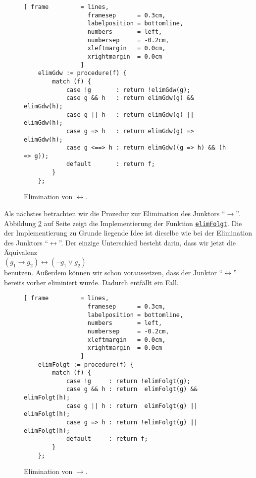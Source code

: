 \begin{figure}[!ht]
  \centering
\begin{Verbatim}[ frame         = lines, 
                  framesep      = 0.3cm, 
                  labelposition = bottomline,
                  numbers       = left,
                  numbersep     = -0.2cm,
                  xleftmargin   = 0.0cm,
                  xrightmargin  = 0.0cm
                ]
    elimGdw := procedure(f) {
        match (f) {
            case !g       : return !elimGdw(g);
            case g && h   : return elimGdw(g) && elimGdw(h);
            case g || h   : return elimGdw(g) || elimGdw(h);
            case g => h   : return elimGdw(g) => elimGdw(h);
            case g <==> h : return elimGdw((g => h) && (h => g));
            default       : return f; 
        }
    };
\end{Verbatim}
\vspace*{-0.3cm}
  \caption{Elimination von $\leftrightarrow$.}
  \label{fig:eliminate-gdw}
\end{figure} 

Als n\"{a}chstes betrachten wir die Prozedur zur Elimination des Junktors ``$\rightarrow$''. 
Abbildung
\ref{fig:eliminate-folgt} auf Seite \pageref{fig:eliminate-folgt} zeigt die
Implementierung der Funktion
\href{https://github.com/karlstroetmann/Logik/blob/master/SetlX/knf.stlx}{\texttt{elimFolgt}}.
Die der Implementierung zu Grunde liegende Idee ist dieselbe wie bei der Elimination des
Junktors ``$\leftrightarrow$''.  Der einzige Unterschied besteht darin, dass wir jetzt die
\"{A}quivalenz \\[0.2cm]
\hspace*{1.3cm} $(g_1 \rightarrow g_2) \leftrightarrow (\neg g_1 \vee g_2)$ \\[0.2cm]
benutzen.  Au\ss{}erdem k\"{o}nnen wir schon voraussetzen, dass der Junktor ``$\leftrightarrow$''
bereits vorher eliminiert wurde.  Dadurch entf\"{a}llt ein Fall.

\begin{figure}[!ht]
  \centering
\begin{Verbatim}[ frame         = lines, 
                  framesep      = 0.3cm, 
                  labelposition = bottomline,
                  numbers       = left,
                  numbersep     = -0.2cm,
                  xleftmargin   = 0.0cm,
                  xrightmargin  = 0.0cm
                ]
    elimFolgt := procedure(f) {
        match (f) {
            case !g     : return !elimFolgt(g);
            case g && h : return  elimFolgt(g) && elimFolgt(h);
            case g || h : return  elimFolgt(g) || elimFolgt(h);
            case g => h : return !elimFolgt(g) || elimFolgt(h);
            default     : return f; 
        }
    };
\end{Verbatim}
\vspace*{-0.3cm}
  \caption{Elimination von $\rightarrow$.}
  \label{fig:eliminate-folgt}
\end{figure}
 

